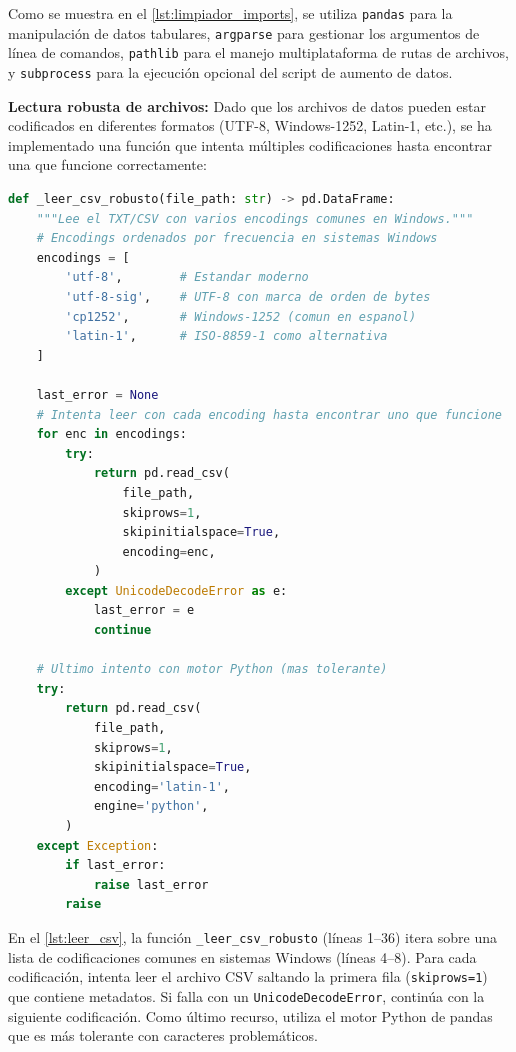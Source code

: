 Como se muestra en el \autoref{lst:limpiador_imports}, se utiliza \texttt{pandas} para la manipulación de datos tabulares, \texttt{argparse} para gestionar los argumentos de línea de comandos, \texttt{pathlib} para el manejo multiplataforma de rutas de archivos, y \texttt{subprocess} para la ejecución opcional del script de aumento de datos.

\textbf{Lectura robusta de archivos:} Dado que los archivos de datos pueden estar codificados en diferentes formatos (UTF-8, Windows-1252, Latin-1, etc.), se ha implementado una función que intenta múltiples codificaciones hasta encontrar una que funcione correctamente:

\begin{lstlisting}[language=Python, caption={Función para lectura robusta de archivos CSV con múltiples codificaciones.}, label={lst:leer_csv}]
def _leer_csv_robusto(file_path: str) -> pd.DataFrame:
    """Lee el TXT/CSV con varios encodings comunes en Windows."""
    # Encodings ordenados por frecuencia en sistemas Windows
    encodings = [
        'utf-8',        # Estandar moderno
        'utf-8-sig',    # UTF-8 con marca de orden de bytes
        'cp1252',       # Windows-1252 (comun en espanol)
        'latin-1',      # ISO-8859-1 como alternativa
    ]

    last_error = None
    # Intenta leer con cada encoding hasta encontrar uno que funcione
    for enc in encodings:
        try:
            return pd.read_csv(
                file_path,
                skiprows=1,
                skipinitialspace=True,
                encoding=enc,
            )
        except UnicodeDecodeError as e:
            last_error = e
            continue

    # Ultimo intento con motor Python (mas tolerante)
    try:
        return pd.read_csv(
            file_path,
            skiprows=1,
            skipinitialspace=True,
            encoding='latin-1',
            engine='python',
        )
    except Exception:
        if last_error:
            raise last_error
        raise
\end{lstlisting}

En el \autoref{lst:leer_csv}, la función \texttt{\_leer\_csv\_robusto} (líneas 1--36) itera sobre una lista de codificaciones comunes en sistemas Windows (líneas 4--8). Para cada codificación, intenta leer el archivo CSV saltando la primera fila (\texttt{skiprows=1}) que contiene metadatos. Si falla con un \texttt{UnicodeDecodeError}, continúa con la siguiente codificación. Como último recurso, utiliza el motor Python de pandas que es más tolerante con caracteres problemáticos.

